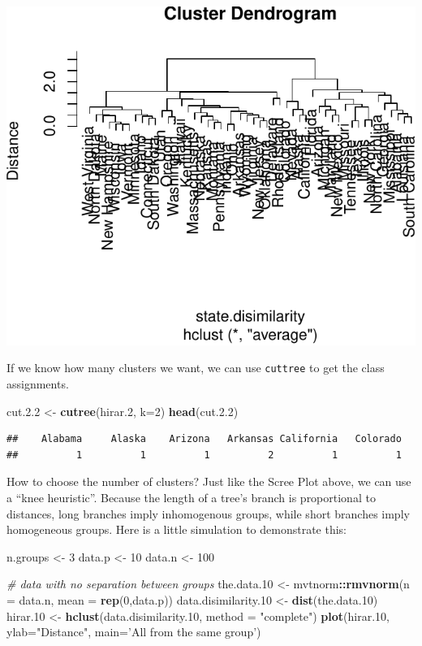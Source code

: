 \documentclass[]{book}
\newenvironment{Shaded}{\begin{snugshade}}{\end{snugshade}}
\newcommand{\KeywordTok}[1]{\textcolor[rgb]{0.13,0.29,0.53}{\textbf{#1}}}
\newcommand{\DataTypeTok}[1]{\textcolor[rgb]{0.13,0.29,0.53}{#1}}
\newcommand{\DecValTok}[1]{\textcolor[rgb]{0.00,0.00,0.81}{#1}}
\newcommand{\FloatTok}[1]{\textcolor[rgb]{0.00,0.00,0.81}{#1}}
\newcommand{\StringTok}[1]{\textcolor[rgb]{0.31,0.60,0.02}{#1}}
\newcommand{\CommentTok}[1]{\textcolor[rgb]{0.56,0.35,0.01}{\textit{#1}}}
\newcommand{\OperatorTok}[1]{\textcolor[rgb]{0.81,0.36,0.00}{\textbf{#1}}}
\newcommand{\NormalTok}[1]{#1}
\theoremstyle{definition}
\theoremstyle{definition}
\theoremstyle{definition}
\theoremstyle{remark}
\begin{document}
\includegraphics[width=0.5\linewidth]{Rcourse_files/figure-latex/average linkage-1}

If we know how many clusters we want, we can use \texttt{cuttree} to get
the class assignments.

\begin{Shaded}
\begin{Highlighting}[]
\NormalTok{cut.}\FloatTok{2.2}\NormalTok{ <-}\StringTok{ }\KeywordTok{cutree}\NormalTok{(hirar.}\DecValTok{2}\NormalTok{, }\DataTypeTok{k=}\DecValTok{2}\NormalTok{)}
\KeywordTok{head}\NormalTok{(cut.}\FloatTok{2.2}\NormalTok{)}
\end{Highlighting}
\end{Shaded}

\begin{verbatim}
##    Alabama     Alaska    Arizona   Arkansas California   Colorado 
##          1          1          1          2          1          1
\end{verbatim}

How to choose the number of clusters? Just like the Scree Plot above, we
can use a ``knee heuristic''. Because the length of a tree's branch is
proportional to distances, long branches imply inhomogenous groups,
while short branches imply homogeneous groups. Here is a little
simulation to demonstrate this:

\begin{Shaded}
\begin{Highlighting}[]
\NormalTok{n.groups <-}\StringTok{ }\DecValTok{3}
\NormalTok{data.p <-}\StringTok{ }\DecValTok{10}
\NormalTok{data.n <-}\StringTok{ }\DecValTok{100}

\CommentTok{# data with no separation between groups}
\NormalTok{the.data.}\DecValTok{10}\NormalTok{ <-}\StringTok{ }\NormalTok{mvtnorm}\OperatorTok{::}\KeywordTok{rmvnorm}\NormalTok{(}\DataTypeTok{n =}\NormalTok{ data.n, }\DataTypeTok{mean =} \KeywordTok{rep}\NormalTok{(}\DecValTok{0}\NormalTok{,data.p))  }
\NormalTok{data.disimilarity.}\DecValTok{10}\NormalTok{ <-}\StringTok{ }\KeywordTok{dist}\NormalTok{(the.data.}\DecValTok{10}\NormalTok{)}
\NormalTok{hirar.}\DecValTok{10}\NormalTok{ <-}\StringTok{ }\KeywordTok{hclust}\NormalTok{(data.disimilarity.}\DecValTok{10}\NormalTok{, }\DataTypeTok{method =} \StringTok{"complete"}\NormalTok{)}
\KeywordTok{plot}\NormalTok{(hirar.}\DecValTok{10}\NormalTok{, }\DataTypeTok{ylab=}\StringTok{"Distance"}\NormalTok{, }\DataTypeTok{main=}\StringTok{'All from the same group'}\NormalTok{)}
\end{Highlighting}
\end{Shaded}
\end{document}
